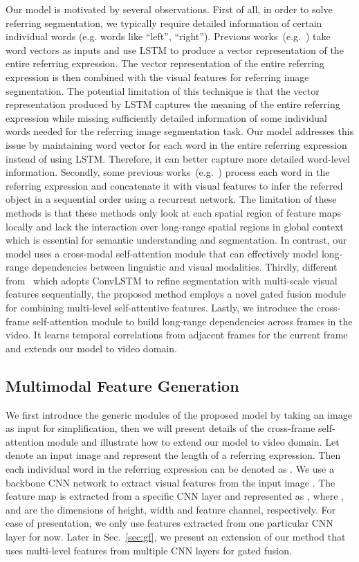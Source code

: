 Our model is motivated by several observations. First of all, in order to solve referring segmentation, we typically require detailed information of certain individual words (e.g. words like ``left'', ``right''). Previous works~(e.g.~\cite{hu2016segmentation,li2018referring,shi2018key}) take word vectors as inputs and use LSTM to produce a vector representation of the entire referring expression. The vector representation of the entire  referring expression is then combined with the visual features for referring image segmentation. The potential limitation of this technique is that the vector representation produced by LSTM captures the meaning of the entire referring expression while missing sufficiently detailed information of some individual words needed for the referring image segmentation task. Our model addresses this issue by maintaining word vector for each word in the entire referring expression instead of using LSTM. Therefore, it can better capture more detailed word-level information. Secondly, some previous works~(e.g.~\cite{liu2017recurrent,margffoy2018dynamic}) process each word in the referring expression and concatenate it with visual features to infer the referred object in a sequential order using a recurrent network. The limitation of these methods is that these methods only look at each spatial region of feature maps locally and lack the interaction over long-range spatial regions in global context which is essential for semantic understanding and segmentation. In contrast, our model uses a cross-modal self-attention module that can effectively model long-range dependencies between linguistic and visual modalities. Thirdly, different from~\cite{li2018referring} which adopts ConvLSTM to refine segmentation with multi-scale visual features sequentially, the proposed method employs a novel gated fusion module for combining multi-level self-attentive features. 
Lastly, we introduce the cross-frame self-attention module to build long-range dependencies across frames in the video. It learns temporal correlations from adjacent frames for the current frame and extends our model to video domain.



\subsection{Multimodal Feature Generation}\label{sec:mfg}
We first introduce the generic modules of the proposed model by taking an image as input for simplification, then we will present details of the cross-frame self-attention module and illustrate how to extend our model to video domain. Let  denote an input image and  represent the length of a referring expression. Then each individual word in the referring expression can be denoted as . We use a backbone CNN network to extract visual features from the input image . The feature map is extracted from a specific CNN layer and represented as , where ,  and  are the dimensions of height, width and feature channel, respectively. For ease of presentation, we only use features extracted from one particular CNN layer for now. Later in Sec.~\ref{sec:gf}, we present an extension of our method that uses multi-level features from multiple CNN layers for gated fusion. 

